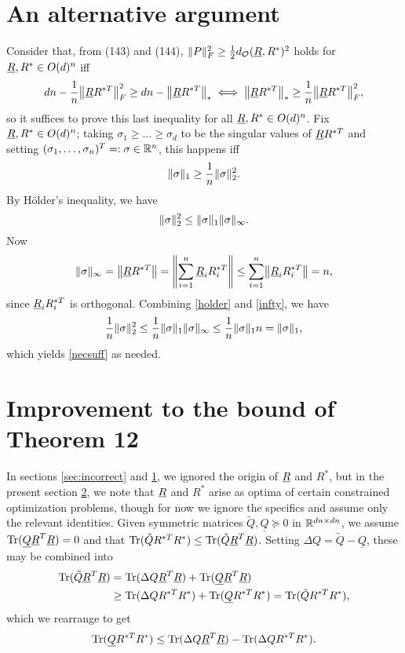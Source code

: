 \section{An alternative argument}
\label{sec:alternative}
Consider that, from (143) and (144), $\lVert P\rVert_F^2 \ge \frac{1}{2} d_{\mathcal{O}}(\underline{R}, R^*)^2$ holds for $\underline{R}, R^* \in O(d)^n$ iff \[dn - \frac{1}{n} \norm*{\uR R^{*T}}_F^2 \ge dn - \norm*{\uR R^{*T}}_* \iff \norm*{\uR R^{*T}}_* \ge \frac{1}{n} \norm*{\uR R^{*T}}_F^2,\] so it suffices to prove this last inequality for all $\underline{R}, R^* \in O(d)^n$.  Fix $\underline{R}, R^* \in O(d)^n$; taking $\sigma_1 \ge \ldots \ge \sigma_d$ to be the singular values of $\underline{R} R^{*T}$ and setting $(\sigma_1, \ldots, \sigma_n)^T =: \sigma \in \mathbb{R}^n$, this happens iff \begin{equation} \lVert\sigma\rVert_1 \ge \frac{1}{n} \lVert\sigma\rVert_2^2. \label{necsuff} \end{equation}  By H\"{o}lder's inequality, we have \begin{equation} \lVert\sigma\rVert_2^2 \le \lVert\sigma\rVert_1 \lVert\sigma\rVert_\infty. \label{holder}\end{equation}  Now \begin{equation} \norm{\sigma}_\infty = \norm*{\uR R^{*T}} = \norm*{\sum_{i = 1}^n \uR_i R^{*T}_i} \le \sum_{i = 1}^n \norm*{\uR_i R^{*T}_i} = n, \label{infty} \end{equation} since $\underline{R}_i R^{*T}_i$ is orthogonal.  Combining \eqref{holder} and \eqref{infty}, we have \[\frac{1}{n} \lVert\sigma\rVert_2^2 \le \frac{1}{n} \lVert\sigma\rVert_1 \lVert\sigma\rVert_\infty \le \frac{1}{n} \lVert\sigma\rVert_1 n = \lVert\sigma\rVert_1,\] which yields \eqref{necsuff} as needed.

\section{Improvement to the bound of Theorem 12}
\label{sec:improve}
In sections \ref{sec:incorrect} and \ref{sec:alternative}, we ignored the origin of $\underline{R}$ and $R^*$, but in the present section \ref{sec:improve}, we note that $\underline{R}$ and $R^*$ arise as optima of certain constrained optimization problems, though for now we ignore the specifics and assume only the relevant identities.  Given symmetric matrices $\tilde{Q}, \underline{Q} \succeq 0$ in $\mathbb{R}^{dn \times dn}$, we assume $\operatorname{Tr}(\underline{Q} \underline{R}^T \underline{R}) = 0$ and that $\operatorname{Tr}(\tilde{Q} R^{*T} R^*) \le \operatorname{Tr}(\tilde{Q} \underline{R}^T \underline{R})$.  Setting $\Delta Q = \tilde{Q} - \underline{Q}$, these may be combined into \begin{align*} \operatorname{Tr}(\tilde{Q} \underline{R}^T \underline{R}) &= \operatorname{Tr}(\Delta Q \underline{R}^T \underline{R}) + \operatorname{Tr}(\underline{Q} \underline{R}^T \underline{R}) \\&\ge \operatorname{Tr}(\Delta Q R^{*T} R^*) + \operatorname{Tr}(\underline{Q} R^{*T} R^*) = \operatorname{Tr}(\tilde{Q} R^{*T} R^*), \end{align*} which we rearrange to get \begin{equation} \operatorname{Tr}(\underline{Q} R^{*T} R^*) \le \operatorname{Tr}(\Delta Q \underline{R}^T \underline{R}) - \operatorname{Tr}(\Delta Q R^{*T} R^*). \label{trinq}\end{equation}


